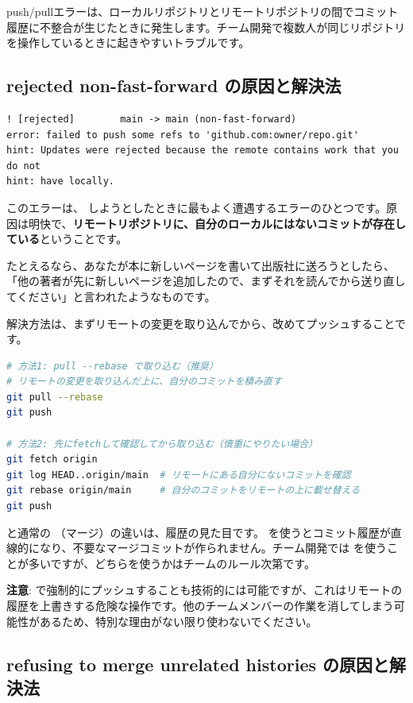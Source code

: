 push/pullエラーは、ローカルリポジトリとリモートリポジトリの間でコミット履歴に不整合が生じたときに発生します。チーム開発で複数人が同じリポジトリを操作しているときに起きやすいトラブルです。

\subsection{rejected non-fast-forward の原因と解決法}

\begin{lstlisting}[language={}]
! [rejected]        main -> main (non-fast-forward)
error: failed to push some refs to 'github.com:owner/repo.git'
hint: Updates were rejected because the remote contains work that you do not
hint: have locally.
\end{lstlisting}

このエラーは、 しようとしたときに最もよく遭遇するエラーのひとつです。原因は明快で、\textbf{リモートリポジトリに、自分のローカルにはないコミットが存在している}ということです。

たとえるなら、あなたが本に新しいページを書いて出版社に送ろうとしたら、「他の著者が先に新しいページを追加したので、まずそれを読んでから送り直してください」と言われたようなものです。

解決方法は、まずリモートの変更を取り込んでから、改めてプッシュすることです。

\begin{lstlisting}[language=bash]
# 方法1: pull --rebase で取り込む（推奨）
# リモートの変更を取り込んだ上に、自分のコミットを積み直す
git pull --rebase
git push

# 方法2: 先にfetchして確認してから取り込む（慎重にやりたい場合）
git fetch origin
git log HEAD..origin/main  # リモートにある自分にないコミットを確認
git rebase origin/main     # 自分のコミットをリモートの上に載せ替える
git push
\end{lstlisting}

 と通常の （マージ）の違いは、履歴の見た目です。 を使うとコミット履歴が直線的になり、不要なマージコミットが作られません。チーム開発では  を使うことが多いですが、どちらを使うかはチームのルール次第です。

\textbf{注意}:  で強制的にプッシュすることも技術的には可能ですが、これはリモートの履歴を上書きする危険な操作です。他のチームメンバーの作業を消してしまう可能性があるため、特別な理由がない限り使わないでください。

\subsection{refusing to merge unrelated histories の原因と解決法}

